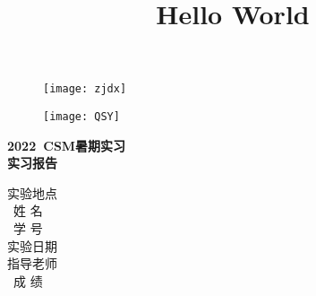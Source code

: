 \documentclass{ctexart}
\title{Hello World}
\begin{document}
\begin{titlepage}
        \vspace*{-2.5cm}
	
	\begin{figure}[h]
		\centering
		\texttt{[image: zjdx]}
	\end{figure}

	\begin{figure}[h]
		\centering
		\texttt{[image: QSY]}
	\end{figure}
	\vspace{-0.5cm}
	\begin{center}
		\Huge{\textbf{2022\ CSM暑期实习}}\\
		
		\Huge{\textbf{实习报告}}
	\end{center}
	
	
	\vspace*{1.5cm}

    \begin{center}
    \Large
            实验地点\ \ \underline{\makebox[220pt]{}}\\
            \vspace{0.3cm}
            \quad\ 姓\; 名 \ \ \underline{}\\
            \vspace{0.3cm}
            \quad\ 学\; 号\ \ \underline{}\\
            \vspace{0.3cm}
            实验日期\ \ \underline{}\\
            \vspace{0.3cm}
            指导老师\ \ \underline{}\\
            \vspace{0.3cm}
            \quad\ 成\; 绩\ \ \underline{}\\

              
            

             
    \end{center}
        
    
\end{titlepage}
\end{document}
